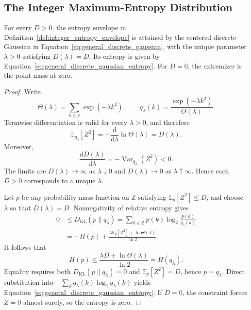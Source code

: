\subsection{The Integer Maximum-Entropy Distribution}

\begin{Lemma}
\label{lem:discrete_gaussian_extremizer}
For every \(D>0\), the entropy envelope in
Definition~\ref{def:integer_entropy_envelope} is attained by the centered
discrete Gaussian in Equation~\eqref{eq:general_discrete_gaussian}, with the
unique parameter \(\lambda>0\) satisfying \(D(\lambda)=D\). Its entropy is
given by Equation~\eqref{eq:general_discrete_gaussian_entropy}. For \(D=0\),
the extremizer is the point mass at zero.
\end{Lemma}

\begin{proof}
Write
\[
\Theta(\lambda)
=
\sum_{k\in\mathbb{Z}}\exp(-\lambda k^2),
\qquad
q_\lambda(k)
=
\frac{\exp(-\lambda k^2)}{\Theta(\lambda)}.
\]
Termwise differentiation is valid for every \(\lambda>0\), and therefore
\[
\mathbb{E}_{q_\lambda}[Z^2]
=
-\frac{\mathrm{d}}{\mathrm{d}\lambda}\ln\Theta(\lambda)
=D(\lambda).
\]
Moreover,
\[
\frac{\mathrm{d}D(\lambda)}{\mathrm{d}\lambda}
=
-\operatorname{Var}_{q_\lambda}(Z^2)<0.
\]
The limits are \(D(\lambda)\to\infty\) as \(\lambda\downarrow0\) and
\(D(\lambda)\to0\) as \(\lambda\uparrow\infty\). Hence each \(D>0\)
corresponds to a unique \(\lambda\).

Let \(p\) be any probability mass function on \(\mathbb{Z}\) satisfying
\(\mathbb{E}_{p}[Z^2]\leq D\), and choose \(\lambda\) so that
\(D(\lambda)=D\). Nonnegativity of relative entropy gives
\begin{align}
0
&\leq
D_{\mathrm{KL}}(p\|q_\lambda)
=
\sum_{k\in\mathbb{Z}}p(k)
\log_2\frac{p(k)}{q_\lambda(k)}
\nonumber\\
&=
-H(p)
+
\frac{\lambda\mathbb{E}_{p}[Z^2]+\ln\Theta(\lambda)}{\ln2}.
\label{eq:kl_discrete_gaussian}
\end{align}
It follows that
\begin{equation}
H(p)
\leq
\frac{\lambda D+\ln\Theta(\lambda)}{\ln2}
=
H(q_\lambda).
\label{eq:integer_max_entropy}
\end{equation}
Equality requires both
\(D_{\mathrm{KL}}(p\|q_\lambda)=0\) and
\(\mathbb{E}_{p}[Z^2]=D\), hence \(p=q_\lambda\). Direct substitution into
\(-\sum_kq_\lambda(k)\log_2q_\lambda(k)\) yields
Equation~\eqref{eq:general_discrete_gaussian_entropy}. If \(D=0\), the
constraint forces \(Z=0\) almost surely, so the entropy is zero.
\end{proof}

